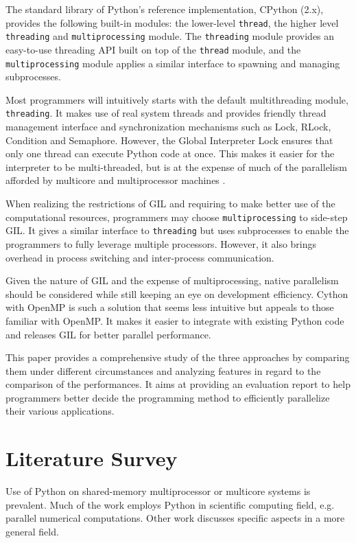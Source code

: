 \documentclass[letterpaper,twocolumn,10pt]{article}
\begin{document}
The standard library of Python's reference implementation, CPython (2.x), provides the following built-in modules: the lower-level \verb#thread#, the higher level \verb#threading# and \verb#multiprocessing# module. The \verb#threading# module provides an easy-to-use threading API built on top of the \verb#thread# module, and the \verb#multiprocessing# module applies a similar interface to spawning and managing subprocesses.

Most programmers will intuitively starts with the default multithreading module, \verb#threading#. It makes use of real system threads and provides friendly thread management interface and synchronization mechanisms such as Lock, RLock, Condition and Semaphore. However, the Global Interpreter Lock ensures that only one thread can execute Python code at once. This makes it easier for the interpreter to be multi-threaded, but is at the expense of much of the parallelism afforded by multicore and multiprocessor machines \cite{glossary}.

When realizing the restrictions of GIL and requiring to make better use of the computational resources, programmers may choose \verb#multiprocessing# to side-step GIL. It gives a similar interface to \verb#threading# but uses subprocesses to enable the programmers to fully leverage multiple processors. However, it also brings overhead in process switching and inter-process communication. 

Given the nature of GIL and the expense of multiprocessing, native parallelism should be considered while still keeping an eye on development efficiency. Cython with OpenMP is such a solution that seems less intuitive but appeals to those familiar with OpenMP. It makes it easier to integrate with existing Python code and releases GIL for better parallel performance.

This paper provides a comprehensive study of the three approaches by comparing them under different circumstances and analyzing features in regard to the comparison of the performances. It aims at providing an evaluation report to help programmers better decide the programming method to efficiently parallelize their various applications.

\section{Literature Survey}
Use of Python on shared-memory multiprocessor or multicore systems is prevalent. Much of the work employs Python in scientific computing field, e.g. parallel numerical computations. Other work discusses specific aspects in a more general field.
\end{document}
